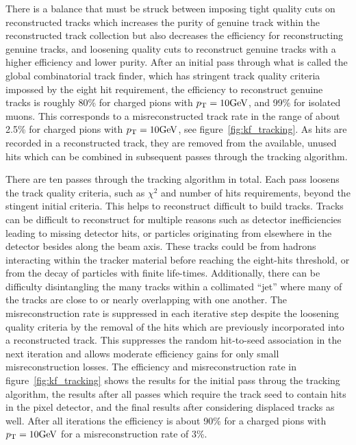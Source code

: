 There is a balance that must be struck between imposing tight quality cuts on reconstructed
tracks which increases the purity of genuine track within the reconstructed track collection
but also decreases the efficiency for reconstructing genuine tracks, and loosening
quality cuts to reconstruct genuine tracks with a higher efficiency and lower purity.
After an initial pass through what is called the global combinatorial track finder,
which has stringent track quality criteria impossed by the eight hit requirement, 
the efficiency to reconstruct
genuine tracks is roughly 80\% for charged pions with $p_\mathrm{T} = 10\mathrm{GeV}$, and 99\%
for isolated muons. This corresponds to a misreconstructed track rate in the range of
about 2.5\% for charged pions with $p_\mathrm{T} = 10\mathrm{GeV}$, see figure~\ref{fig:kf_tracking}.
As hits are recorded in a reconstructed track, they are removed from the available,
unused hits which can be combined in subsequent passes through the tracking algorithm.

There are ten passes through the tracking algorithm in total. Each pass loosens the track quality criteria,
such as $\chi^2$ and number of hits requirements, beyond the stingent initial criteria.
This helps to reconstruct difficult to build tracks. Tracks can be difficult to 
reconstruct for multiple reasons such as detector inefficiencies leading to missing
detector hits, or particles originating from elsewhere in the detector 
besides along the beam axis. These tracks could be from hadrons interacting
within the tracker material before reaching the eight-hits threshold, or from the decay
of particles with finite life-times. Additionally, there can be difficulty disintangling
the many tracks within a collimated ``jet'' where many of the tracks are close to or
nearly overlapping with one another.
The misreconstruction rate is suppressed in each iterative step despite the loosening
quality criteria by the removal of the hits which are previously incorporated into
a reconstructed track. This  suppresses the random hit-to-seed association in the
next iteration and allows moderate efficiency gains for only small misreconstruction losses.
The efficiency and misreconstruction rate in figure~\ref{fig:kf_tracking} shows the
results for the initial pass throug the tracking algorithm, the results after all
passes which require the track seed to contain hits in the pixel detector, and the
final results after considering displaced tracks as well.
After all iterations the efficiency is about 90\% for a charged pions with $p_\mathrm{T} = 10\mathrm{GeV}$
for a misreconstruction rate of 3\%.

